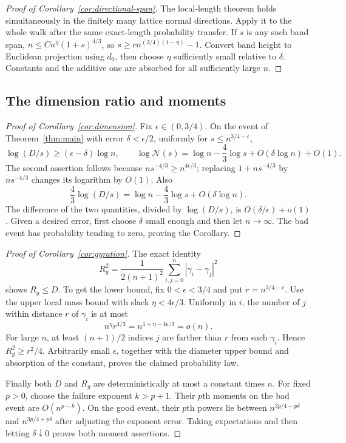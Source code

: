 \begin{proof}[Proof of Corollary~\ref{cor:directional-span}]
The local-length theorem holds simultaneously in the finitely many
lattice normal directions. Apply it to the whole walk after the same
exact-length probability transfer. If \(s\) is any such band span,
\(n\le Cn^\eta(1+s)^{4/3}\), so
\(s\ge c n^{(3/4)(1-\eta)}-1\). Convert band height to Euclidean
projection using \(d_0\), then choose \(\eta\) sufficiently small
relative to \(\delta\). Constants and the additive one are absorbed
for all sufficiently large \(n\).
\end{proof}

\subsection{The dimension ratio and moments}
\begin{proof}[Proof of Corollary~\ref{cor:dimension}]
Fix $\epsilon\in(0,3/4)$. On the event of Theorem~\ref{thm:main} with error $\delta<\epsilon/2$, uniformly for $s\le n^{3/4-\epsilon}$,
\[
 \log(D/s)\ge(\epsilon-\delta)\log n,
 \qquad
 \log\mathcal N(s)=\log n-\frac43\log s+O(\delta\log n)+O(1).
\]
The second assertion follows because $ns^{-4/3}\ge n^{4\epsilon/3}$; replacing $1+ns^{-4/3}$ by $ns^{-4/3}$ changes its logarithm by $O(1)$. Also
\[
 \frac43\log(D/s)=\log n-\frac43\log s+O(\delta\log n).
\]
The difference of the two quantities, divided by $\log(D/s)$, is $O(\delta/\epsilon)+o(1)$. Given a desired error, first choose $\delta$ small enough and then let $n\to\infty$. The bad event has probability tending to zero, proving the Corollary.
\end{proof}

\begin{proof}[Proof of Corollary~\ref{cor:gyration}]
The exact identity
\[
 R_g^2=\frac1{2(n+1)^2}\sum_{i,j=0}^n|\gamma_i-\gamma_j|^2
\]
shows $R_g\le D$. To get the lower bound, fix $0<\epsilon<3/4$ and put $r=n^{3/4-\epsilon}$. Use the upper local mass bound with slack $\eta<4\epsilon/3$. Uniformly in $i$, the number of $j$ within distance $r$ of $\gamma_i$ is at most
\[
 n^\eta r^{4/3}=n^{1+\eta-4\epsilon/3}=o(n).
\]
For large $n$, at least $(n+1)/2$ indices $j$ are farther than $r$ from each $\gamma_i$. Hence $R_g^2\ge r^2/4$. Arbitrarily small $\epsilon$, together with the diameter upper bound and absorption of the constant, proves the claimed probability law.

Finally both $D$ and $R_g$ are deterministically at most a constant times $n$. For fixed $p>0$, choose the failure exponent $k>p+1$. Their $p$th moments on the bad event are $O(n^{p-k})$. On the good event, their $p$th powers lie between $n^{3p/4-p\delta}$ and $n^{3p/4+p\delta}$ after adjusting the exponent error. Taking expectations and then letting $\delta\downarrow0$ proves both moment assertions.
\end{proof}
